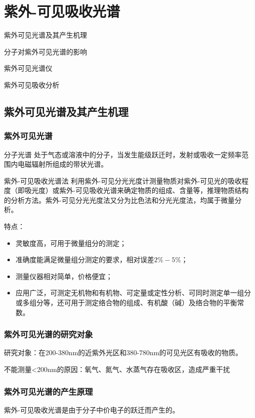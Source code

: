 \chapter{紫外-可见吸收光谱}
\begin{introduction}
    \item 紫外可见光谱及其产生机理
    \item 分子对紫外可见光谱的影响
    \item 紫外可见光谱仪
    \item 紫外可见吸收分析
\end{introduction}
\section{紫外可见光谱及其产生机理}
\subsection{紫外可见光谱}
\begin{definition*}{分子光谱}
    处于气态或溶液中的分子，当发生能级跃迁时，发射或吸收一定频率范围内电磁辐射所组成的带状光谱。
\end{definition*}
\begin{definition*}{紫外-可见吸收光谱法}
    利用紫外-可见分光光度计测量物质对紫外-可见光的吸收程度（即吸光度）或紫外-可见吸收光谱来确定物质的组成、含量等，推理物质结构的分析方法。紫外-可见分光光度法又分为比色法和分光光度法，均属于微量分析。
\end{definition*}
特点：
\begin{itemize}
    \item 灵敏度高，可用于微量组分的测定；
    \item 准确度能满足微量组分测定的要求，相对误差$2\%-5\%$；
    \item 测量仪器相对简单，价格便宜；
    \item 应用广泛，可测定无机物和有机物、可定量或定性分析、可同时测定单一组分或多组分等，还可用于测定络合物的组成、有机酸（碱）及络合物的平衡常数。
\end{itemize}
\subsection{紫外可见光谱的研究对象}
研究对象：在200-380nm的近紫外光区和380-780nm的可见光区有吸收的物质。
\begin{note}
    不能测量<200nm的原因：氧气、氮气、水蒸气存在吸收区，造成严重干扰
\end{note}
\subsection{紫外可见光谱的产生原理}
紫外-可见吸收光谱是由于分子中价电子的跃迁而产生的。
